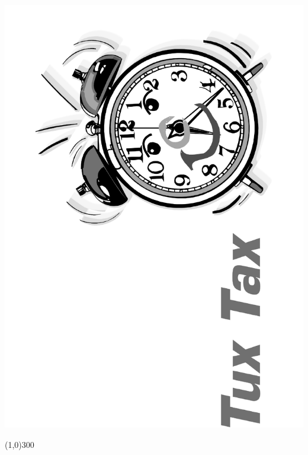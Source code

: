 \begin{center}
\begin{normalsize}
        \includegraphics[scale=0.1,angle=-90]{graphics/tuxtax.pdf}\\
    \end{normalsize}
    \line(1,0){300}\\
    \begin{small}
        \placemacro
    \end{small}
\end{center}
